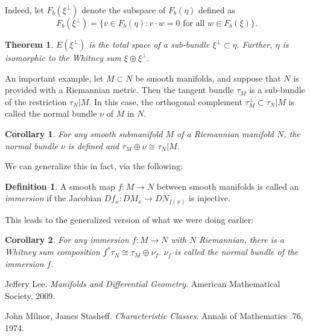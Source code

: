 \documentclass{article}
\newtheorem{theorem}{Theorem}[section]
\newtheorem{cor}{Corollary}[section]
\theoremstyle{definition}
\newtheorem{defn}{Definition}[section]
\begin{document}
Indeed, let $F_{b}(\xi^{\bot})$ denote the subspace of $F_{b}(\eta)$ defined as \[F_{b}(\xi^{\bot})=\{v\in F_{b}(\eta):v\cdot w=0\text{ for all }w\in F_{b}(\xi)\}.\]
\begin{theorem}
$E(\xi^{\bot})$ is the total space of a sub-bundle $\xi^{\bot}\subset\eta.$ Further, $\eta$ is isomorphic to the Whitney sum $\xi\oplus\xi^{\bot}.$
\end{theorem}
An important example, let $M\subset N$ be smooth manifolds, and suppose that $N$ is provided with a Riemannian metric. Then the tangent bundle $\tau_{M}$ is a sub-bundle of the restriction $\tau_{N}|M$. In this case, the orthogonal complement $\tau_{M}^{\bot}\subset\tau_{N}|M$ is called the normal bundle $\nu$ of $M$ in $N$. 
\begin{cor}
For any smooth submanifold $M$ of a Riemannian manifold $N$, the normal bundle $\nu$ is defined and $\tau_{M}\oplus\nu\cong\tau_{N}|M.$ 
\end{cor}
We can generalize this in fact, via the following:
\begin{defn}
A smooth map $f:M\rightarrow N$ between smooth manifolds is called an \textit{immersion} if the Jacobian $Df_{x}:DM_{x}\rightarrow DN_{f(x)}$ is injective.  
\end{defn}
This leads to the generalized version of what we were doing earlier:
\begin{cor}
For any immersion $f:M\rightarrow N$ with $N$ Riemannian, there is a Whitney sum composition $f^{*}\tau_{N}\cong\tau_{M}\oplus\nu_{f}.$ $\nu_{f}$ is called the \textit{normal bundle} of the immersion $f$.
\end{cor}




\begin{thebibliography}{9}
Jeffery Lee. 
\textit{Manifolds and Differential Geometry}. 
American Mathematical Society, 2009.

John Milnor, James Stasheff.
\textit{Characteristic Classes}.
Annals of Mathematics .76, 1974.
\end{thebibliography}
\end{document}
